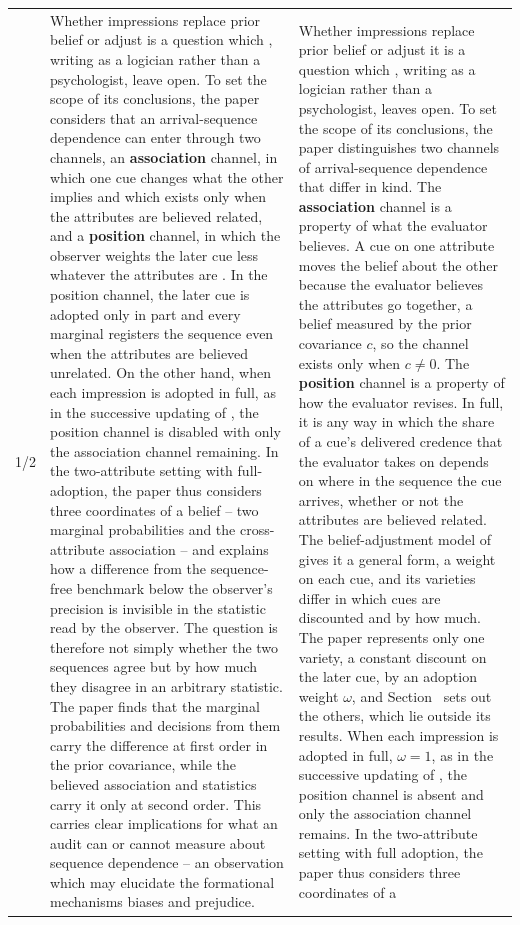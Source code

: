 \documentclass[10pt]{article}
\theoremstyle{definition}
\renewcommand{\ref}[1]{\textsc{\detokenize{#1}}}
\begin{document}
{\begin{longtable}{|p{0.9cm}|p{12.2cm}|p{12.2cm}|}
1/2 & Whether impressions replace prior belief or adjust is a question which \citet{Hawthorne2004}, writing as a logician rather than a psychologist, leave open. To set the scope of its conclusions, the paper considers that an arrival-sequence dependence can enter through two channels, an \textbf{association} channel, in which one cue changes what the other implies and which exists only when the attributes are believed related, and a \textbf{position} channel, in which the observer weights the later cue less whatever the attributes are \citep{HogarthEinhorn1992,Asch1946}. In the position channel, the later cue is adopted only in part and every marginal registers the sequence even when the attributes are believed unrelated. On the other hand, when each impression is adopted in full, as in the successive updating of \citet{DiaconisZabell1982}, the position channel is disabled with only the association channel remaining. In the two-attribute setting with full-adoption, the paper thus considers three coordinates of a belief -- two marginal probabilities and the cross-attribute association -- and explains how a difference from the sequence-free benchmark below the observer's precision is invisible in the statistic read by the observer. The question is therefore not simply whether the two sequences agree but by how much they disagree in an arbitrary statistic. The paper finds that the marginal probabilities and decisions from them carry the difference at first order in the prior covariance, while the believed association and statistics carry it only at second order. This carries clear implications for what an audit can or cannot measure about sequence dependence -- an observation which may elucidate the formational mechanisms biases and prejudice. & Whether impressions replace prior belief or adjust it is a question which \citet[pp.~115--116]{Hawthorne2004}, writing as a logician rather than a psychologist, leaves open. To set the scope of its conclusions, the paper distinguishes two channels of arrival-sequence dependence that differ in kind. The \textbf{association} channel is a property of what the evaluator believes. A cue on one attribute moves the belief about the other because the evaluator believes the attributes go together, a belief measured by the prior covariance $c$, so the channel exists only when $c\neq0$. The \textbf{position} channel is a property of how the evaluator revises. In full, it is any way in which the share of a cue's delivered credence that the evaluator takes on depends on where in the sequence the cue arrives, whether or not the attributes are believed related. The belief-adjustment model of \citet{HogarthEinhorn1992} gives it a general form, a weight on each cue, and its varieties differ in which cues are discounted and by how much. The paper represents only one variety, a constant discount on the later cue, by an adoption weight $\omega$, and Section~\ref{sec:scope} sets out the others, which lie outside its results. When each impression is adopted in full, $\omega=1$, as in the successive updating of \citet{DiaconisZabell1982}, the position channel is absent and only the association channel remains. In the two-attribute setting with full adoption, the paper thus considers three coordinates of a 
\end{longtable}}
\end{document}
